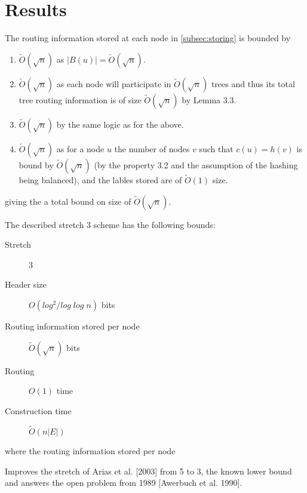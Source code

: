 \section{Results}
The routing information stored at each node in \ref{subsec:storing} is bounded by
\begin{enumerate}
    \item $\tilde{O}(\sqrt{n})$ as $|B(u)| = \tilde{O}(\sqrt{n})$.
    \item $\tilde{O}(\sqrt{n})$ as each node will participate in $\tilde{O}(\sqrt{n})$ trees and thus its total tree routing information is of size $\tilde{O}(\sqrt{n})$ by Lemma 3.3.
    \item $\tilde{O}(\sqrt{n})$ by the same logic as for the above.
    \item $\tilde{O}(\sqrt{n})$ as for a node $u$ the number of nodes $v$ such that $c(u) = h(v)$ is bound by $\tilde{O}(\sqrt{n})$ (by the property 3.2 and the assumption of the hashing being balanced), and the lables stored are of $\tilde{O}(1)$ size.
\end{enumerate}
giving the a total bound on size of $\tilde{O}(\sqrt{n})$.

The described stretch 3 scheme has the following bounds:
\begin{description}
    \item[Stretch] 3
    \item[Header size] $O(log^2/log\;log\;n)$ bits
    \item[Routing information stored per node] $\tilde{O}(\sqrt{n})$ bits
    \item[Routing] $O(1)$ time
    \item[Construction time] $\tilde{O}(n|E|)$
\end{description}
where the routing information stored per node 

Improves the stretch of Arias et al. [2003] from 5 to 3, the known lower bound and answers the open problem from 1989 [Awerbuch et al. 1990].
